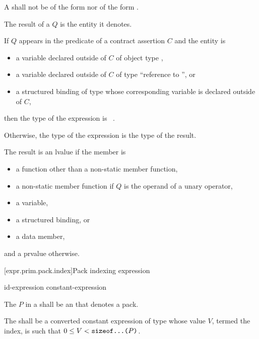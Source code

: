 \pnum
A  shall not be of the form
  \tcode{\~}
nor of the form
 \tcode{::} \tcode{\~} .

\pnum
The result of a  $Q$ is
the entity it denotes.

\pnum
If $Q$ appears
in the predicate of a contract assertion $C$
and the entity is
\begin{itemize}
\item
a variable
declared outside of $C$
of object type ,
\item
a variable
declared outside of $C$
of type ``reference to '', or
\item
a structured binding of type 
whose corresponding variable
is declared outside of $C$,
\end{itemize}
then the type of the expression is ~.


\pnum
Otherwise, the type of the expression is the type of the result.

\pnum
The result is an lvalue if the member is
\begin{itemize}
\item
a function other than a non-static member function,
\item
a non-static member function
if $Q$ is the operand of a unary \tcode{\&} operator,
\item
a variable,
\item
a structured binding, or
\item
a data member,
\end{itemize}
and a prvalue otherwise.

[expr.prim.pack.index]{Pack indexing expression}

\begin{bnf}
\br
    id-expression  \terminal{[} constant-expression \terminal{]}
\end{bnf}

\pnum
The  $P$ in a 
shall be an  that denotes a pack.

\pnum
The  shall be
a converted constant expression of type 
whose value $V$, termed the index,
is such that $0 \le V < \tcode{sizeof...($P$)}$.

